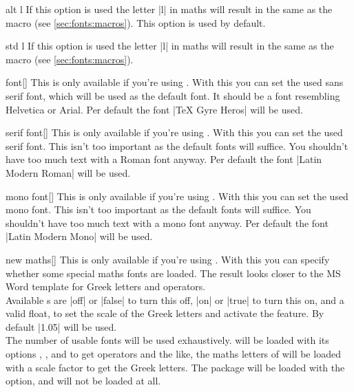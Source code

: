 \begin{describeopt}{alt l}
  If this option is used the letter |l| in maths will result in the same as the
   macro (see \autoref{sec:fonts:macros}). This option is used by
  default.
\end{describeopt}
\begin{describeopt}{std l}
  If this option is used the letter |l| in maths will result in the same as the
   macro (see \autoref{sec:fonts:macros}).
\end{describeopt}
\begin{describeopt}{font}[]
  This is only available if you're using \luaxetex. With this you can set the
  used sans serif font, which will be used as the default font. It should be
  a font resembling Helvetica or Arial. Per default the font
  \bverb|TeX Gyre Heros| will be used.
\end{describeopt}
\begin{describeopt}{serif font}[]
  This is only available if you're using \luaxetex. With this you can set the
  used serif font. This isn't too important as the default fonts will suffice.
  You shouldn't have too much text with a Roman font anyway. Per default the
  font \bverb|Latin Modern Roman| will be used.
\end{describeopt}
\begin{describeopt}{mono font}[]
  This is only available if you're using \luaxetex. With this you can set the
  used mono font. This isn't too important as the default fonts will suffice.
  You shouldn't have too much text with a mono font anyway. Per default the
  font \bverb|Latin Modern Mono| will be used.
\end{describeopt}
\begin{describeopt}{new maths}[]
  This is only available if you're using . With this you can
  specify whether some special maths fonts are loaded. The result looks closer
  to the MS Word template for Greek letters and operators.\\
  Available s are |off| or |false| to turn this off, |on| or |true|
  to turn this on, and a valid float, to set the scale of the Greek letters and
  activate the feature.  By default |1.05| will be used.\\
  The number of usable fonts will be used exhaustively.  will be
  loaded with its options , ,  and
   to get operators and the like, the maths letters of
   will be loaded with a scale factor to get the Greek letters.
  The  package will be loaded with the  option, and
   will not be loaded at all.
\end{describeopt}

